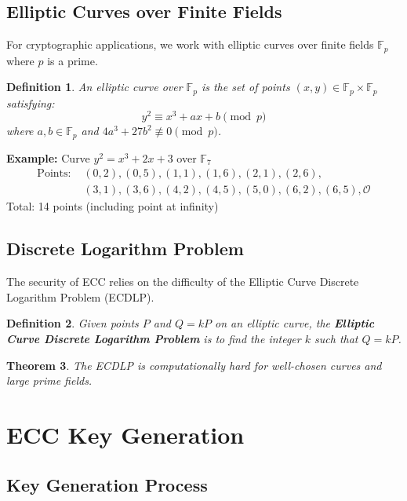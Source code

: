 \documentclass[11pt,a4paper]{article}
\newtheorem{theorem}{Theorem}[section]
\newtheorem{definition}[theorem]{Definition}
\begin{document}
\subsection{Elliptic Curves over Finite Fields}

For cryptographic applications, we work with elliptic curves over finite fields $\mathbb{F}_p$ where $p$ is a prime.

\begin{definition}
An elliptic curve over $\mathbb{F}_p$ is the set of points $(x,y) \in \mathbb{F}_p \times \mathbb{F}_p$ satisfying:
$$y^2 \equiv x^3 + ax + b \pmod{p}$$
where $a, b \in \mathbb{F}_p$ and $4a^3 + 27b^2 \not\equiv 0 \pmod{p}$.
\end{definition}

\begin{examplebox}
\textbf{Example:} Curve $y^2 = x^3 + 2x + 3$ over $\mathbb{F}_7$
\begin{align*}
\text{Points: } &(0,2), (0,5), (1,1), (1,6), (2,1), (2,6), \\
&(3,1), (3,6), (4,2), (4,5), (5,0), (6,2), (6,5), \mathcal{O}
\end{align*}
Total: 14 points (including point at infinity)
\end{examplebox}

\subsection{Discrete Logarithm Problem}

The security of ECC relies on the difficulty of the Elliptic Curve Discrete Logarithm Problem (ECDLP).

\begin{definition}
Given points $P$ and $Q = kP$ on an elliptic curve, the \textbf{Elliptic Curve Discrete Logarithm Problem} is to find the integer $k$ such that $Q = kP$.
\end{definition}

\begin{theorem}
The ECDLP is computationally hard for well-chosen curves and large prime fields.
\end{theorem}

\section{ECC Key Generation}

\subsection{Key Generation Process}
\end{document}
